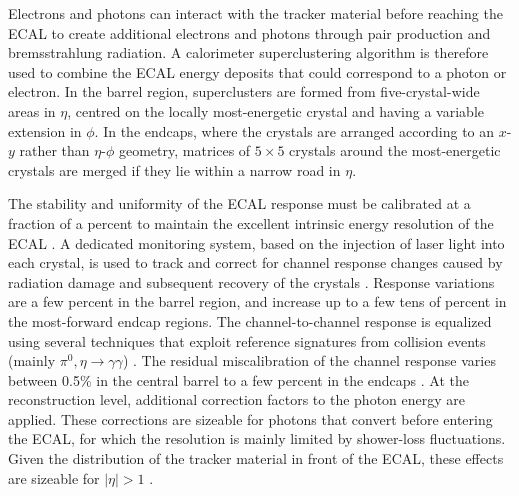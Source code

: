 \documentclass[12pt,twoside,a4paper,cmspaper,final,collab]{cms-tdr}
\begin{document}
Electrons and photons can interact with the tracker material before reaching
the ECAL to create additional electrons and photons through pair
production and bremsstrahlung radiation.
A calorimeter superclustering algorithm is therefore used to combine
the ECAL energy deposits that could correspond to a photon or electron.
In the barrel region, superclusters are formed from five-crystal-wide areas
in $\eta$, centred on the locally most-energetic crystal and
having a variable extension in $\phi$.
In the endcaps, where the crystals are arranged according to an $x$-$y$ rather than $\eta$-$\phi$ geometry,
matrices of $5\times5$ crystals
around the most-energetic crystals are merged if they lie within
a narrow road in $\eta$.

The stability and uniformity of the ECAL response must be
calibrated at a fraction of a percent to maintain the excellent intrinsic
energy resolution of the ECAL \cite{ECAL-EnergyResol}. %
A dedicated monitoring system, based on the injection of laser light
into each crystal, is used to track and correct for channel response
changes caused by radiation damage and subsequent recovery of the crystals
\cite{ECAL-LaserMonit}. Response variations are a few percent in the
barrel region, and increase up to a few tens of percent in the most-forward
endcap regions.
The channel-to-channel response is equalized using several techniques
that exploit reference signatures from collision events (mainly
$\pi^0, \eta \to \gamma\gamma$) \cite{ECAL-Calibrations}. %
The residual miscalibration of the channel response
varies between 0.5\% in the central barrel to a few percent in
the endcaps \cite{ECAL-Role}.
At the reconstruction level, additional correction factors to the
photon energy are applied.
These corrections are sizeable for photons that convert before entering the ECAL, for
which the resolution is mainly limited by shower-loss
fluctuations. Given the distribution of the tracker material in front
of the ECAL, these effects are sizeable for $|\eta|>1$  \cite{ECAL-Role}.
\end{document}
